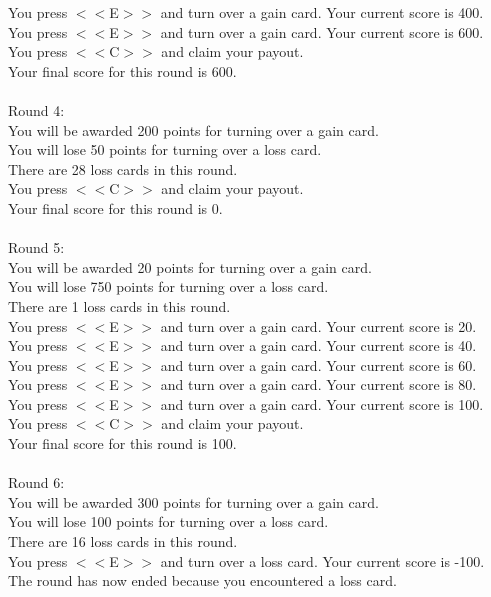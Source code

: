 \documentclass[pdflatex,sn-nature]{sn-jnl}%
\theoremstyle{thmstyleone}%
\theoremstyle{thmstyletwo}%
\theoremstyle{thmstylethree}%
\begin{document}
You press $<<$E$>>$ and turn over a gain card. Your current score is 400. $~$\\ 
You press $<<$E$>>$ and turn over a gain card. Your current score is 600. $~$\\ 
You press $<<$C$>>$ and claim your payout. $~$\\ 
Your final score for this round is 600. $~$\\ 
 $~$\\ 
Round 4: $~$\\ 
You will be awarded 200 points for turning over a gain card. $~$\\ 
You will lose 50 points for turning over a loss card. $~$\\ 
There are 28 loss cards in this round. $~$\\ 
You press $<<$C$>>$ and claim your payout. $~$\\ 
Your final score for this round is 0. $~$\\ 
 $~$\\ 
Round 5: $~$\\ 
You will be awarded 20 points for turning over a gain card. $~$\\ 
You will lose 750 points for turning over a loss card. $~$\\ 
There are 1 loss cards in this round. $~$\\ 
You press $<<$E$>>$ and turn over a gain card. Your current score is 20. $~$\\ 
You press $<<$E$>>$ and turn over a gain card. Your current score is 40. $~$\\ 
You press $<<$E$>>$ and turn over a gain card. Your current score is 60. $~$\\ 
You press $<<$E$>>$ and turn over a gain card. Your current score is 80. $~$\\ 
You press $<<$E$>>$ and turn over a gain card. Your current score is 100. $~$\\ 
You press $<<$C$>>$ and claim your payout. $~$\\ 
Your final score for this round is 100. $~$\\ 
 $~$\\ 
Round 6: $~$\\ 
You will be awarded 300 points for turning over a gain card. $~$\\ 
You will lose 100 points for turning over a loss card. $~$\\ 
There are 16 loss cards in this round. $~$\\ 
You press $<<$E$>>$ and turn over a loss card. Your current score is -100. The round has now ended because you encountered a loss card. $~$\\ 
\end{document}
